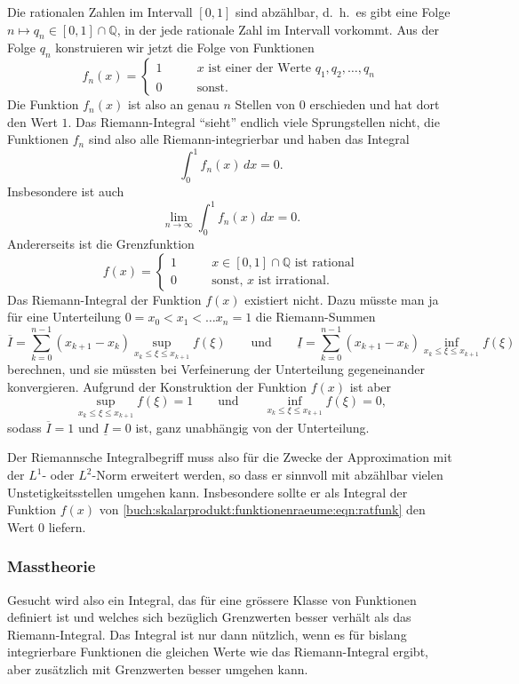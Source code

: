 Die rationalen Zahlen im Intervall $[0,1]$ sind abzählbar, d.~h.~es
gibt eine Folge $n\mapsto q_n\in[0,1]\cap\mathbb{Q}$, in der jede
rationale Zahl im Intervall vorkommt.
Aus der Folge $q_n$ konstruieren wir jetzt die Folge von Funktionen
\[
f_n(x)
=
\begin{cases} 
1&\qquad\text{$x$ ist einer der Werte $q_1,q_2,\ldots,q_n$}\\
0&\qquad\text{sonst}.
\end{cases}
\]
Die Funktion $f_n(x)$ ist also an genau $n$ Stellen von $0$ erschieden
und hat dort den Wert $1$.
Das Riemann-Integral ``sieht'' endlich viele Sprungstellen nicht,
die Funktionen $f_n$ sind also alle Riemann-integrierbar und haben
das Integral
\[
\int_0^1 f_n(x)\,dx=0.
\]
Insbesondere ist auch
\[
\lim_{n\to\infty}\int_0^1 f_n(x)\,dx = 0.
\]
Andererseits ist die Grenzfunktion
\begin{equation}
f(x)
=
\begin{cases}
1&\qquad\text{$x\in[0,1]\cap\mathbb{Q}$ ist rational}\\
0&\qquad\text{sonst, $x$ ist irrational.}
\end{cases}
\label{buch:skalarprodukt:funktionenraeume:eqn:ratfunk}
\end{equation}
Das Riemann-Integral der Funktion $f(x)$ existiert nicht.
Dazu müsste man ja für eine Unterteilung $0=x_0<x_1<\dots x_n=1$
die Riemann-Summen
\[
\overline{I}
=
\sum_{k=0}^{n-1}
(x_{k+1}-x_k) \sup_{x_k\le \xi \le x_{k+1}} f(\xi)
\qquad\text{und}\qquad
\underline{I}
=
\sum_{k=0}^{n-1}
(x_{k+1}-x_k) \inf_{x_k\le \xi \le x_{k+1}} f(\xi)
\]
berechnen, und sie müssten bei Verfeinerung der Unterteilung
gegeneinander konvergieren.
Aufgrund der Konstruktion der Funktion $f(x)$ ist aber
\[
\sup_{x_k\le \xi \le x_{k+1}} f(\xi) = 1
\qquad\text{und}\qquad
\inf_{x_k\le \xi \le x_{k+1}} f(\xi) = 0,
\]
sodass
$\overline{I}=1$ und $\underline{I}=0$ ist, ganz unabhängig von
der Unterteilung.

Der Riemannsche Integralbegriff muss also für die Zwecke der Approximation
mit der $L^1$- oder $L^2$-Norm erweitert werden, so dass er sinnvoll mit
abzählbar vielen Unstetigkeitsstellen umgehen kann.
Insbesondere sollte er als Integral der Funktion $f(x)$ 
von \eqref{buch:skalarprodukt:funktionenraeume:eqn:ratfunk}
den Wert $0$ liefern.

%
%
\subsubsection{Masstheorie}
Gesucht wird also ein Integral, das für eine grössere Klasse von
Funktionen definiert ist und welches sich bezüglich Grenzwerten
besser verhält als das Riemann-Integral.
Das Integral ist nur dann nützlich, wenn es für bislang
integrierbare Funktionen die gleichen Werte wie das Riemann-Integral
ergibt, aber zusätzlich mit Grenzwerten besser umgehen kann.

